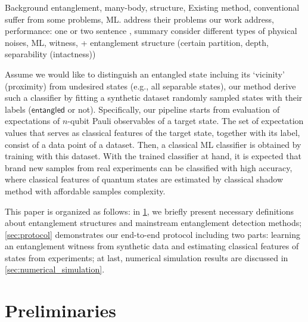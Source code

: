 \documentclass[
aps,
pra,
twocolumn,
floatfix,
]{revtex4-2}
\theoremstyle{plain}
\theoremstyle{definition}
\newtheorem{notation}{Notation}
\newcommand{\ew}{W}
\newcommand{\ob}{O}
\newcommand{\dm}{\rho}
\newcommand{\entangled}{\textsf{entangled}}
\newcommand{\hamiltonian}{\hat{H}}
\begin{document}
Background 
entanglement, many-body, structure, 
Existing method, conventional
suffer from some problems, 
ML. address 
their problems
our work address, 
performance: one or two sentence , summary
consider different types of physical noises,
ML, witness, 
+ entanglement structure (certain partition, depth,  separability (intactness))


Assume we would like to distinguish an entangled state incluing its `vicinity' (proximity) from undesired states (e.g., all separable states), our method derive such a classifier by fitting a synthetic dataset randomly sampled states with their labels ($\entangled$ or not).
Specifically, our pipeline starts from evaluation of expectations of $n$-qubit Pauli observables of a target state. 
The set of expectation values that serves as classical features of the target state, together with its label, consist of a data point of a dataset.
Then, a classical ML classifier is obtained by training with this dataset.
With the trained classifier at hand, it is expected that brand new samples from real experiments can be classified with high accuracy, 
where classical features of quantum states are estimated by classical shadow method \cite{huangPredictingManyProperties2020} with affordable samples complexity.

This paper is organized as follows: in \cref{sec:preliminaries}, we briefly present necessary definitions about entanglement structures and mainstream entanglement detection methods;
\cref{sec:protocol} demonstrates our end-to-end protocol including two parts: learning an entanglement witness from synthetic data and estimating classical features of states from experiments;
at last, numerical simulation results are discussed in \cref{sec:numerical_simulation}.

\section{Preliminaries}\label{sec:preliminaries}
\end{document}
